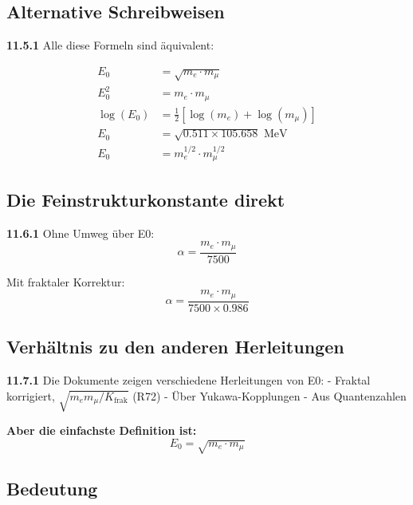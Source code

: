 \subsection{Alternative Schreibweisen}

\noindent \textbf{11.5.1} Alle diese Formeln sind äquivalent:

\begin{align}
	E_0 &= \sqrt{m_e \cdot m_\mu} \\
	E_0^2 &= m_e \cdot m_\mu \\
	\log(E_0) &= \frac{1}{2}[\log(m_e) + \log(m_\mu)] \\
	E_0 &= \sqrt{0.511 \times 105.658} \text{ MeV} \\
	E_0 &= m_e^{1/2} \cdot m_\mu^{1/2}
\end{align}

\subsection{Die Feinstrukturkonstante direkt}

\begin{tcolorbox}[colback=green!5!white,colframe=green!75!black,title=\textbf{Die direkteste Formel}]
	\noindent \textbf{11.6.1} Ohne Umweg über E0:
	\begin{equation}
		\boxed{\alpha = \frac{m_e \cdot m_\mu}{7500}}
	\end{equation}
	
	Mit fraktaler Korrektur:
	\begin{equation}
		\boxed{\alpha = \frac{m_e \cdot m_\mu}{7500 \times 0.986}}
	\end{equation}

\end{tcolorbox}

\subsection{Verhältnis zu den anderen Herleitungen}

\noindent \textbf{11.7.1} Die Dokumente zeigen verschiedene Herleitungen von E0:
- Fraktal korrigiert, $\sqrt{m_e m_\mu/K_{\text{frak}}}$ (R72)
- Über Yukawa-Kopplungen
- Aus Quantenzahlen

\textbf{Aber die einfachste Definition ist:}
\begin{equation}
	\boxed{E_0 = \sqrt{m_e \cdot m_\mu}}
\end{equation}

\subsection{Bedeutung}


